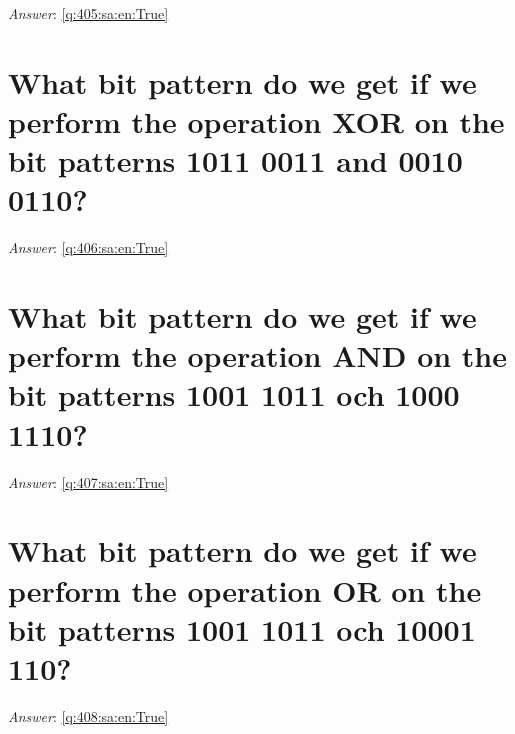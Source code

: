 \documentclass[a4paper,11pt,oneside]{book}
\begin{document}
\begin{sloppypar}
\noindent\makebox[\textwidth]{\hrulefill}

\vspace{1cm}

\textit{Answer}: \autoref{q:405:sa:en:True}



\section{What bit pattern do we get if we perform the operation XOR on the bit patterns 1011 0011 and 0010 0110?}

\label{q:406:sa:en:False}

\vspace{2cm}

\noindent\makebox[\textwidth]{\hrulefill}

\vspace{1cm}

\textit{Answer}: \autoref{q:406:sa:en:True}



\section{What bit pattern do we get if we perform the operation AND on the bit patterns 1001 1011 och 1000 1110?}

\label{q:407:sa:en:False}

\vspace{2cm}

\noindent\makebox[\textwidth]{\hrulefill}

\vspace{1cm}

\textit{Answer}: \autoref{q:407:sa:en:True}



\section{What bit pattern do we get if we perform the operation OR on the bit patterns 1001 1011 och 10001 110?}

\label{q:408:sa:en:False}

\vspace{2cm}

\noindent\makebox[\textwidth]{\hrulefill}

\vspace{1cm}

\textit{Answer}: \autoref{q:408:sa:en:True}




\end{sloppypar}
\end{document}
